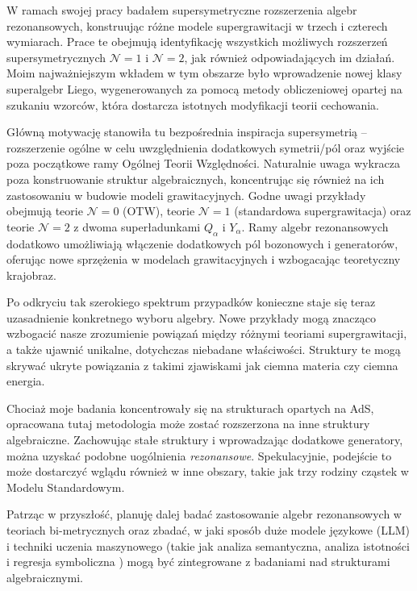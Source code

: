 \documentclass[12pt,a4paper]{article}
\begin{document}
W ramach swojej pracy badałem supersymetryczne rozszerzenia algebr rezonansowych, konstruując różne modele supergrawitacji w trzech i czterech wymiarach. Prace te obejmują identyfikację wszystkich możliwych rozszerzeń supersymetrycznych $\mathcal{N}=1$ i $\mathcal{N}=2$, jak również odpowiadających im działań. Moim najważniejszym wkładem w tym obszarze było wprowadzenie nowej klasy superalgebr Liego, wygenerowanych za pomocą metody obliczeniowej opartej na szukaniu wzorców, która dostarcza istotnych modyfikacji teorii cechowania.

Główną motywację stanowiła tu bezpośrednia inspiracja supersymetrią – rozszerzenie ogólne w celu uwzględnienia dodatkowych symetrii/pól oraz wyjście poza początkowe ramy Ogólnej Teorii Względności. Naturalnie uwaga wykracza poza konstruowanie struktur algebraicznych, koncentrując się również na ich zastosowaniu w budowie modeli grawitacyjnych. Godne uwagi przykłady obejmują teorie $\mathcal{N}=0$ (OTW), teorie $\mathcal{N}=1$ (standardowa supergrawitacja) oraz teorie $\mathcal{N}=2$ z dwoma superładunkami $Q_\alpha$ i $Y_\alpha$. Ramy algebr rezonansowych dodatkowo umożliwiają włączenie dodatkowych pól bozonowych i generatorów, oferując nowe sprzężenia w modelach grawitacyjnych i wzbogacając teoretyczny krajobraz.

Po odkryciu tak szerokiego spektrum przypadków konieczne staje się teraz uzasadnienie konkretnego wyboru algebry. Nowe przykłady mogą znacząco wzbogacić nasze zrozumienie powiązań między różnymi teoriami supergrawitacji, a także ujawnić unikalne, dotychczas niebadane właściwości. Struktury te mogą skrywać ukryte powiązania z takimi zjawiskami jak ciemna materia czy ciemna energia.

Chociaż moje badania koncentrowały się na strukturach opartych na AdS, opracowana tutaj metodologia może zostać rozszerzona na inne struktury algebraiczne. Zachowując stałe struktury i wprowadzając dodatkowe generatory, można uzyskać podobne uogólnienia \textit{rezonansowe}. Spekulacyjnie, podejście to może dostarczyć wglądu również w inne obszary, takie jak trzy rodziny cząstek w Modelu Standardowym.

Patrząc w przyszłość, planuję dalej badać zastosowanie algebr rezonansowych w teoriach bi-metrycznych oraz zbadać, w jaki sposób duże modele językowe (LLM) i techniki uczenia maszynowego (takie jak analiza semantyczna, analiza istotności i regresja symboliczna \cite{Udrescu:2019mnk}) mogą być zintegrowane z badaniami nad strukturami algebraicznymi.
\end{document}
